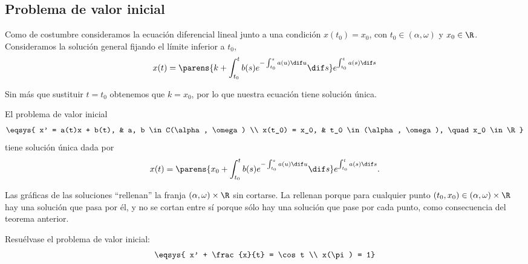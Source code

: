 \documentclass[../ecuaciones_diferenciales.tex]{subfiles}
\begin{document}
\subsection{Problema de valor inicial}

Como de costumbre consideramos la ecuación diferencial lineal junto a una
condición \(x(t_0) = x_0\), con \(t_0 \in (\alpha, \omega)\) y \(x_0 \in \R\).
Consideramos la solución general fijando el límite inferior a \(t_0\),
\[x(t) = \parens{k + \int_{t_0}^t b(s) e^{-\int_{t_0}^s a(u) \dif u} \dif s}
	e^{\int_{t_0}^t a(s) \dif s}\]

Sin más que sustituir \(t = t_0\) obtenemos que \(k = x_0\), por lo que
nuestra ecuación tiene solución única.

\begin{theorem}
	El problema de valor inicial
	\[\eqsys{
			x' = a(t)x + b(t), & a, b \in C(\alpha, \omega) \\
			x(t_0) = x_0, 	  & t_0 \in (\alpha, \omega), \quad x_0 \in \R}\]
	tiene solución única dada por
	\[x(t) =
		\parens{x_0 + \int_{t_0}^t b(s) e^{-\int_{t_0}^s a(u) \dif u} \dif s}
		e^{\int_{t_0}^t a(s) \dif s}.\]
\end{theorem}

Las gráficas de las soluciones ``rellenan'' la franja
\((\alpha, \omega) \times \R\) sin cortarse. La rellenan porque para cualquier
punto \((t_0, x_0) \in (\alpha, \omega) \times \R\) hay una solución que pasa
por él, y no se cortan entre sí porque sólo hay una solución que pase por cada
punto, como consecuencia del teorema anterior.

\begin{example}
	Resuélvase el problema de valor inicial:
	\[\eqsys{
			x' + \frac{x}{t} = \cos t \\
			x(\pi) = 1}\]
\end{example}
\end{document}
